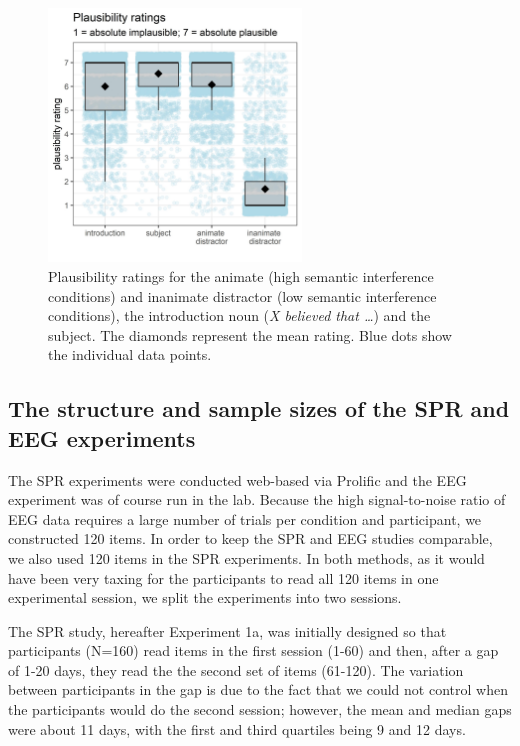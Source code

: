 \documentclass[a4paper, man, floatsintext]{apa7}
\begin{document}
\begin{figure}[H]
\caption{Plausibility ratings for the animate (high semantic interference conditions) and inanimate distractor (low semantic interference conditions), the introduction noun (\textit{X believed that \dots}) and the subject. The diamonds represent the mean rating. Blue dots show the individual data points. }\label{fig:plausibility_rating}
\centering
\includegraphics[width=0.6\textwidth]{images/pandora_plausibility_ratings.jpg}
\end{figure}


\subsection{The structure and sample sizes of the SPR and EEG experiments}

The SPR experiments were conducted web-based via Prolific and the EEG experiment was of course run in the lab.  Because the high signal-to-noise ratio of EEG data requires a large number of trials per condition and participant, we constructed 120 items. In order to keep the SPR and EEG studies comparable, we also used 120 items in the SPR experiments. In both methods, as it would have been very taxing for the participants to read all 120 items in one experimental session, we split the experiments into two sessions. 

The SPR study, hereafter Experiment 1a, was initially designed so that participants  (N=160) read items in the first session (1-60) and then, after a gap of 1-20 days, they read the the second set of items (61-120). The variation between participants in the gap is due to the fact that we could not control when the participants would do the second session; however, the mean and median gaps were  about 11 days, with the first and third quartiles being 9 and 12 days.
\end{document}
